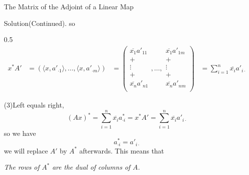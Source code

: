 \documentclass[hyperref={pdfpagelabels=true}]{beamer}
\newcommand{\structb}[1]{\textcolor[rgb]{0.2,0.2,0.7}{#1}}
\newcommand{\<}{\langle}
\renewcommand{\>}{\rangle}
\newenvironment{shrinkeq}[1]%
{ \bgroup
  \addtolength\abovedisplayshortskip{#1}
  \addtolength\abovedisplayskip{#1}
  \addtolength\belowdisplayshortskip{#1}
  \addtolength\belowdisplayskip{#1}}
{\egroup\ignorespacesafterend}
\begin{document}
\begin{frame}{The Matrix of the Adjoint of a Linear Map}
    \begin{block}{Solution(Continued).}
        so
        \begin{spacing}{0.5}
        \begin{shrinkeq}{-0.5em}
        \[
            \begin{aligned}
                x^{*}A' &= (\<x,a'_{\cdot 1}\>,...,\<x,a'_{\cdot m}\>) 
                &= 
        \left(
            \begin{array}{c}
                \overline{x_{1}}a'_{11}\\
                +\\
                \vdots\\
                +\\
                \overline{x_{n}}a'_{n1}\\
            \end{array},...,
            \begin{array}{c}
                \overline{x_{1}}a'_{1m}\\
                +\\
                \vdots\\
                +\\
                \overline{x_{n}}a'_{nm}\\
            \end{array}
        \right)
        &=\sum_{i = 1}^{n}\overline{x_{i}}a'_{i \cdot}
        \end{aligned}
        \]
        \end{shrinkeq}
        \end{spacing}
        \structb{(3)Left equals right,}
        \begin{shrinkeq}{-0.3em}
        \[(Ax)^{*} = \sum_{i = 1}^{n}\overline{x_{i}}a_{\cdot i}^{*} = x^{*}A' = \sum_{i = 1}^{n} \overline{x_{i}}a'_{i \cdot}\]
        \end{shrinkeq}
        so we have 
        \begin{shrinkeq}{-0.5em}
        \[a_{\cdot i}^{*} = a'_{i \cdot}\]
        \end{shrinkeq}
        we will replace $A'$ by $A^{*}$ afterwards. This means that \\
        \begin{center}
        \textit{The rows of $A^{*}$ are the dual of columns of $A$.}
        \end{center}
    \end{block}
\end{frame}
\end{document}
